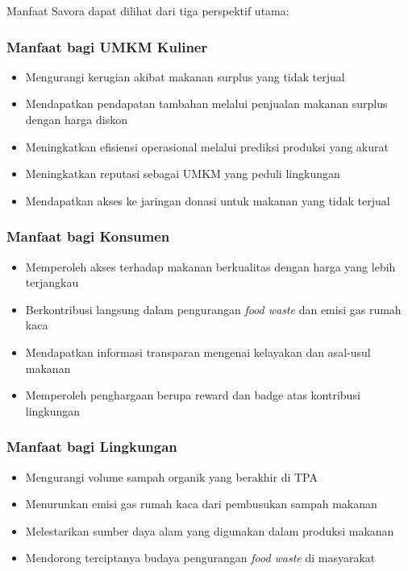 Manfaat Savora dapat dilihat dari tiga perspektif utama:

\subsubsection{Manfaat bagi UMKM Kuliner}
\begin{itemize}[leftmargin=*]
    \item Mengurangi kerugian akibat makanan surplus yang tidak terjual
    \item Mendapatkan pendapatan tambahan melalui penjualan makanan surplus dengan harga diskon
    \item Meningkatkan efisiensi operasional melalui prediksi produksi yang akurat
    \item Meningkatkan reputasi sebagai UMKM yang peduli lingkungan
    \item Mendapatkan akses ke jaringan donasi untuk makanan yang tidak terjual
\end{itemize}

\subsubsection{Manfaat bagi Konsumen}
\begin{itemize}[leftmargin=*]
    \item Memperoleh akses terhadap makanan berkualitas dengan harga yang lebih terjangkau
    \item Berkontribusi langsung dalam pengurangan \textit{food waste} dan emisi gas rumah kaca
    \item Mendapatkan informasi transparan mengenai kelayakan dan asal-usul makanan
    \item Memperoleh penghargaan berupa reward dan badge atas kontribusi lingkungan
\end{itemize}

\subsubsection{Manfaat bagi Lingkungan}
\begin{itemize}[leftmargin=*]
    \item Mengurangi volume sampah organik yang berakhir di TPA
    \item Menurunkan emisi gas rumah kaca dari pembusukan sampah makanan
    \item Melestarikan sumber daya alam yang digunakan dalam produksi makanan
    \item Mendorong terciptanya budaya pengurangan \textit{food waste} di masyarakat
\end{itemize}

